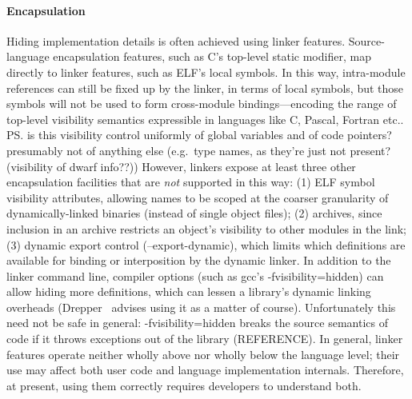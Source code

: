 
\paragraph{Encapsulation}
Hiding implementation details is often achieved using linker features. 
Source-language encapsulation features,
such as C's top-level \textsf{static} modifier, 
map directly to linker features, such as ELF's local symbols.
In this way, intra-module references can still be fixed up by the linker,
in terms of local symbols, but those symbols 
will not be used to form cross-module bindings---encoding the range of top-level
visibility semantics expressible in languages like C, Pascal, Fortran etc..
\ps{is this visibility control uniformly of global variables and of
  code pointers?  presumably not of anything else (e.g.~type names, as
  they're just not present?  (visibility of dwarf info??))}
However, linkers expose at least three other encapsulation facilities
that are \emph{not} supported in this way: (1) ELF symbol visibility attributes,
allowing names to be scoped at the coarser granularity of 
dynamically-linked binaries (instead of single object files);
(2) archives,
since inclusion in an archive restricts an object's visibility 
to other modules in the link;
(3) dynamic export control (\textsf{--export-dynamic}), which limits 
which definitions are available for binding or interposition by the dynamic linker.
In addition to the linker command line, 
compiler options (such as \textsf{gcc}'s \textsf{-fvisibility=hidden})
can allow hiding more definitions,
which can lessen a library's dynamic linking overheads
(Drepper~\citet{drepper} advises using it as a matter of course).
Unfortunately this need not be safe in general: \textsf{-fvisibility=hidden}
breaks the source semantics of \Cplusplus{} code if it throws exceptions 
out of the library (REFERENCE).
In general, linker features operate neither wholly above nor wholly below the language level; 
their use may affect both user code and language implementation internals.
Therefore, at present, using them correctly requires developers to understand both.

